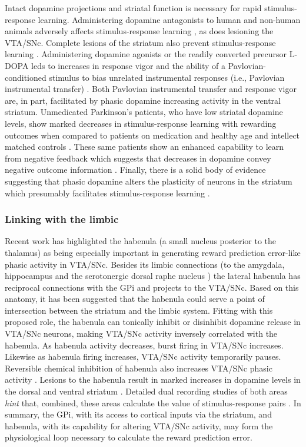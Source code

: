 Intact dopamine projections and striatal function is necessary for rapid stimulus-response learning.  Administering dopamine antagonists to human and non-human animals adversely affects stimulus-response learning \citep{Pizzagalli:2008p6521}, as does lesioning the VTA/SNc.  Complete lesions of the striatum also prevent stimulus-response learning \citep{Packard:2002p5074}.  Administering dopamine agonists or the readily converted precursor L-DOPA leds to increases in response vigor and the ability of a Pavlovian-conditioned stimulus to bias unrelated instrumental responses (i.e., Pavlovian instrumental transfer) \citep{Winterbauer:2007p6352}. Both Pavlovian instrumental transfer and response vigor are, in part, facilitated by phasic dopamine increasing activity in the ventral striatum.  Unmedicated Parkinson's patients, who have low striatal dopamine levels, show marked decreases in stimulus-response learning with rewarding outcomes when compared to patients on medication and healthy age and intellect matched controls \citep{Pizzagalli:2008p6521}.  These same patients show an enhanced capability to learn from negative feedback which suggests that decreases in dopamine convey negative outcome information \citep{Frank:2004p4709}.  Finally, there is a solid body of evidence suggesting that phasic dopamine alters the plasticity of neurons in the striatum which presumably facilitates stimulus-response learning \citep{Calabresi:2007p4284}.

\subsubsection{Linking with the limbic}
\label{subsub:limbic}
Recent work has highlighted the habenula (a small nucleus posterior to the thalamus) as being especially important in generating reward prediction error-like phasic activity in VTA/SNc.  Besides its limbic connections (to the amygdala, hippocampus and the serotonergic dorsal raphe nucleus \citep{Hikosaka:2008p4455}) the lateral habenula has reciprocal connections with the GPi and projects to the VTA/SNc.  Based on this anatomy, it has been suggested that the habenula could serve a point of intersection between the striatum and the limbic system.  Fitting with this proposed role, the habenula can tonically inhibit or disinhibit dopamine release in VTA/SNc neurons, making VTA/SNc activity inversely correlated with the habenula.  As habenula activity decreases, burst firing in VTA/SNc increases.  Likewise as habenula firing increases, VTA/SNc activity temporarily pauses.  Reversible chemical inhibition of habenula also increases VTA/SNc phasic activity \citep{Hikosaka:2008p4455}.  Lesions to the habenula result in marked increases in dopamine levels in the dorsal and ventral striatum \citep{BrombergMartin:2010p7221}.  Detailed dual recording studies of both areas \emph{hint} that, combined, these areas calculate the value of stimulus-response pairs \citep{BrombergMartin:2010p7221}.  In summary, the GPi, with its access to cortical inputs via the striatum, and habenula, with its capability for altering VTA/SNc activity, may form the physiological loop necessary to calculate the reward prediction error.

